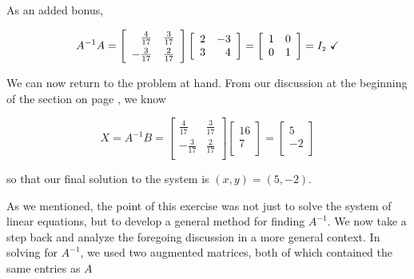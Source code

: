 As an added bonus, 

\[ A^{-1}A = \left[ \begin{array}{rr} \frac{4}{17} & \frac{3}{17} \\[3pt]  -\frac{3}{17} & \frac{2}{17} \\ \end{array} \right]\left[ \begin{array}{rr} 2 & -3 \\ 3 & 4 \\ \end{array} \right]  = \left[ \begin{array}{rr} 1 & 0 \\ 0 & 1 \\ \end{array} \right] = I_{\mbox{\tiny$2$}} \, \, \checkmark\]

We can now return to the problem at hand.  From our discussion at the beginning of the section on page \pageref{solvingmatrixeqn}, we know

\[ X = A^{-1}B = \left[ \begin{array}{rr} \frac{4}{17} & \frac{3}{17} \\[3pt]  -\frac{3}{17} & \frac{2}{17} \\ \end{array} \right]\left[ \begin{array}{r} 16 \\ 7 \\ \end{array} \right] = \left[ \begin{array}{r} 5 \\ -2 \\ \end{array} \right] \]

so that our final solution to the system is $(x,y) = (5,-2)$.   

\smallskip

As we mentioned, the point of this exercise was not just to solve the system of linear equations, but to develop a general method for finding $A^{-1}$.  We now take a step back and analyze the foregoing discussion in a more general context.  In solving for $A^{-1}$, we used two augmented matrices, both of which  contained the same entries as $A$


